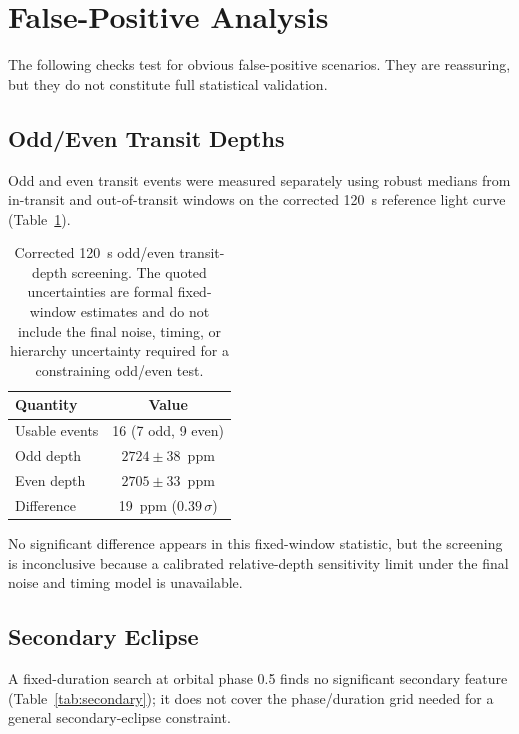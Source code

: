 \documentclass[11pt]{article}
\begin{document}
\section{False-Positive Analysis}
\label{sec:fpvetting}

The following checks test for obvious false-positive scenarios.  They are
reassuring, but they do not constitute full statistical validation.

\subsection{Odd/Even Transit Depths}

Odd and even transit events were measured separately using robust medians from
in-transit and out-of-transit windows on the corrected 120~s reference
light curve (Table~\ref{tab:oddeven}).

\begin{table}[ht]
\centering
\caption{Corrected 120~s odd/even transit-depth screening.  The quoted
  uncertainties are formal fixed-window estimates and do not include the
  final noise, timing, or hierarchy uncertainty required for a constraining
  odd/even test.}
\label{tab:oddeven}
\begin{tabular}{lc}
\toprule
Quantity & Value \\
\midrule
Usable events  & 16 (7 odd, 9 even) \\
Odd depth      & $2724 \pm 38$~ppm \\
Even depth     & $2705 \pm 33$~ppm \\
Difference     & 19~ppm ($0.39\,\sigma$) \\
\bottomrule
\end{tabular}
\end{table}

No significant difference appears in this fixed-window statistic, but the
screening is inconclusive because a calibrated relative-depth sensitivity
limit under the final noise and timing model is unavailable.

\subsection{Secondary Eclipse}

A fixed-duration search at orbital phase 0.5 finds no significant secondary
feature (Table~\ref{tab:secondary}); it does not cover the phase/duration grid
needed for a general secondary-eclipse constraint.
\end{document}
